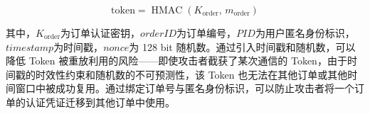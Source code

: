 \begin{equation}
\mathrm{token} = \operatorname{HMAC}(K_{\mathrm{order}},\, m_{\mathrm{order}})
\end{equation}

其中，$K_{\mathrm{order}}$为订单认证密钥，$\mathit{orderID}$为订单编号，$\mathit{PID}$为用户匿名身份标识，$\mathit{timestamp}$为时间戳，$\mathit{nonce}$为 128 bit 随机数。通过引入时间戳和随机数，可以降低 Token 被重放利用的风险——即使攻击者截获了某次通信的 Token，由于时间戳的时效性约束和随机数的不可预测性，该 Token 也无法在其他订单或其他时间窗口中被成功复用。通过绑定订单号与匿名身份标识，可以防止攻击者将一个订单的认证凭证迁移到其他订单中使用。
